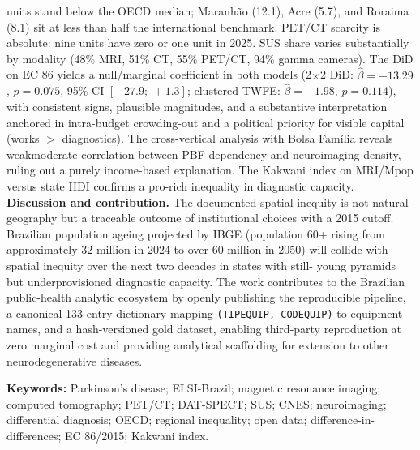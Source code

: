 \documentclass[12pt,a4paper,oneside]{article}
\begin{document}
\begin{singlespace}
units stand below the OECD median; Maranhão (12.1), Acre (5.7),
and Roraima (8.1) sit at less than half the international benchmark.
PET/CT scarcity is absolute: nine units have zero or one unit in
2025. SUS share varies substantially by modality (48\% MRI, 51\%
CT, 55\% PET/CT, 94\% gamma cameras). The DiD on EC 86 yields a
null/marginal coefficient in both models (2$\times$2 DiD:
$\hat\beta = -13.29$, $p = 0.075$, 95\% CI $[-27.9;\,+1.3]$;
clustered TWFE: $\hat\beta = -1.98$, $p = 0.114$), with consistent
signs, plausible magnitudes, and a substantive interpretation
anchored in intra-budget crowding-out and a political priority for
visible capital (works $>$ diagnostics). The cross-vertical analysis
with Bolsa Família reveals weak\textendash moderate correlation
between PBF dependency and neuroimaging density, ruling out a
purely income-based explanation. The Kakwani index on MRI/Mpop
versus state HDI confirms a pro-rich inequality in diagnostic
capacity. \textbf{Discussion and contribution.} The documented
spatial inequity is not natural geography but a traceable outcome
of institutional choices with a 2015 cutoff. Brazilian population
ageing projected by IBGE (population 60+ rising from approximately
32 million in 2024 to over 60 million in 2050) will collide with
spatial inequity over the next two decades in states with still-
young pyramids but underprovisioned diagnostic capacity. The work
contributes to the Brazilian public-health analytic ecosystem by
openly publishing the reproducible pipeline, a canonical 133-entry
dictionary mapping \texttt{(TIPEQUIP, CODEQUIP)} to equipment names,
and a hash-versioned gold dataset, enabling third-party reproduction
at zero marginal cost and providing analytical scaffolding for
extension to other neurodegenerative diseases.

\vspace{0.4cm}\noindent\textbf{Keywords:}
Parkinson's disease; ELSI-Brazil; magnetic resonance imaging;
computed tomography; PET/CT; DAT-SPECT; SUS; CNES; neuroimaging;
differential diagnosis; OECD; regional inequality; open data;
difference-in-differences; EC 86/2015; Kakwani index.
\end{singlespace}

\newpage

\renewcommand{\contentsname}{Sumário}
\tableofcontents

\newpage
\renewcommand{\listfigurename}{Lista de Figuras}
\listoffigures
\end{document}
